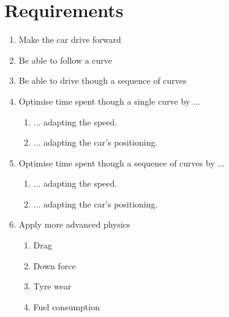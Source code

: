 \section{Requirements}
\begin{enumerate}
  \item Make the car drive forward
  \item Be able to follow a curve
  \item Be able to drive though a sequence of curves
  \item Optimise time spent though a single curve by ...
    \begin{enumerate}
        \item ... adapting the speed.
        \item ... adapting the car's positioning.
    \end{enumerate}
  \item Optimise time spent though a sequence of curves by ...
    \begin{enumerate}
        \item ... adapting the speed.
        \item ... adapting the car's positioning.
    \end{enumerate}
    \item Apply more advanced physics
    \begin{enumerate}
        \item Drag
        \item Down force
        \item Tyre wear
        \item Fuel consumption
    \end{enumerate}
\end{enumerate}